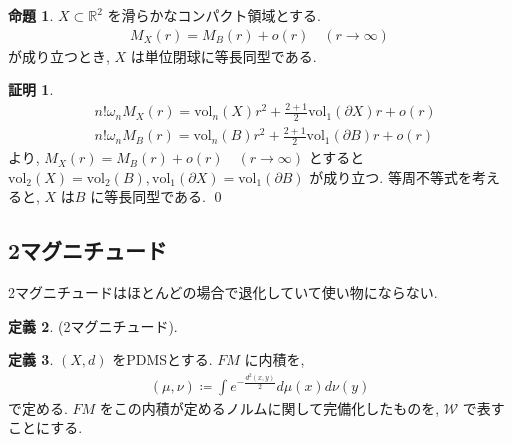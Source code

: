 \documentclass[10pt, fleqn, label-section=none]{bxjsarticle}
\theoremstyle{definition}
\newtheorem{dfn}{定義}[section]
\newtheorem{prop}[dfn]{命題}
\newtheorem*{pf*}{証明}
\newcommand{\vol}{\textrm{vol}}
\renewcommand{\;}{\, ; \,}
\begin{document}
\begin{prop}$X \subset \mathbb R^2$ を滑らかなコンパクト領域とする. 
\begin{align*} M_X (r) = M_B (r) + o(r) \quad (r \rightarrow \infty ) \end{align*}
が成り立つとき, $X$ は単位閉球に等長同型である. 

\end{prop}
\begin{pf*}
\begin{align*}&n! \omega_n M_X (r) = \vol_n (X) r^2 + \frac{2 + 1}{2} \vol_1 (\partial X) r + o(r) \\ 
&n! \omega_n M_B (r) = \vol_n (B) r^2 + \frac{2 + 1}{2} \vol_1 (\partial B) r + o(r) 
\end{align*}
より, $M_X (r) = M_B (r) + o(r) \quad (r \rightarrow \infty ) $ とすると$\vol_2 (X) = \vol_2 (B), \vol_1 (\partial X) = \vol_1 (\partial B)$ が成り立つ. 等周不等式を考えると, $X$ は$B$ に等長同型である. 
\qed
\end{pf*}







\subsection{2マグニチュード}

\begin{screen}
2マグニチュードはほとんどの場合で退化していて使い物にならない. 
\end{screen}

\begin{dfn}(2マグニチュード). 

\end{dfn}

\begin{dfn}$(X, d)$ をPDMSとする. $FM$ に内積を, 
\begin{align*} (\mu, \nu) \coloneqq \int e^{-\frac{d^2(x,y)}{2}} d\mu(x) d\nu(y)  \end{align*}
で定める. $FM$ をこの内積が定めるノルムに関して完備化したものを, $\mathcal W$ で表すことにする. 
\end{dfn}
\end{document}

